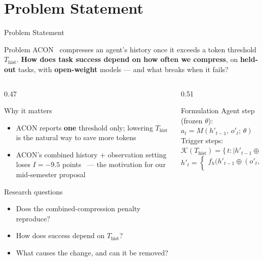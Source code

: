 \documentclass[aspectratio=169,10pt]{beamer}
\begin{document}
\section{Problem Statement}
\begin{frame}{Problem Statement}
\begin{block}{Problem}
\small
ACON~\cite{ACON} compresses an agent's history once it exceeds a token threshold
$T_{\mathrm{hist}}$. \textbf{How does task success depend on how often we
compress}, on \textbf{held-out} tasks, with \textbf{open-weight} models --- and
what breaks when it fails?
\end{block}
\vspace{-0.1cm}
\begin{columns}[T]
\begin{column}{0.47\textwidth}
\begin{alertblock}{Why it matters}
\footnotesize
\begin{itemize}
  \item ACON reports \textbf{one} threshold only; lowering $T_{\mathrm{hist}}$
        is the natural way to save more tokens
  \item ACON's combined history $+$ observation setting loses
        $I=\mathbf{-9.5}$ points~\cite{ACON} --- the motivation for our
        mid-semester proposal
\end{itemize}
\end{alertblock}
\begin{block}{Research questions}
\footnotesize
\begin{itemize}
  \item[\textbf{RQ1}] Does the combined-compression penalty reproduce?
  \item[\textbf{RQ2}] How does success depend on $T_{\mathrm{hist}}$?
  \item[\textbf{RQ3}] What causes the change, and can it be removed?
\end{itemize}
\end{block}
\end{column}
\begin{column}{0.51\textwidth}
\begin{block}{Formulation}
\footnotesize
Agent step (frozen $\theta$):\; $a_t = M(h'_{t-1},\,o'_t;\,\theta)$\\[3pt]
Trigger steps:\;
$\mathcal{K}(T_{\mathrm{hist}})=\{\,t : |h'_{t-1}\oplus(o'_t,a_t)|>T_{\mathrm{hist}}\,\}$
\[
h'_t=\begin{cases} f_h\big(h'_{t-1}\oplus(o'_t,a_t);\,g\big) & t\in\mathcal{K}\\

\end{cases}\]
\end{block}
\end{column}
\end{columns}
\end{frame}
\end{document}
